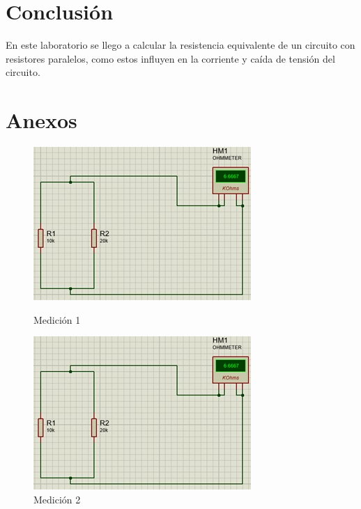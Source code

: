 \section{Conclusión}
En este laboratorio se llego a calcular la resistencia equivalente de un circuito con resistores paralelos, como estos influyen en la corriente y caída de tensión del circuito.
\section{Anexos}

	\begin{figure}[h]
		\begin{minipage}{0.5\textwidth}
			\centering
			\includegraphics[width=0.8\linewidth]{imagenes/8}
			\caption{Medición 1}
		\end{minipage}%
		\begin{minipage}{0.5\textwidth}
			\centering
			\includegraphics[width=0.8\linewidth]{imagenes/9}
			\caption{Medición 2}
		\end{minipage}
	\end{figure}
	
